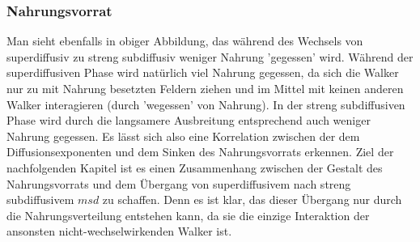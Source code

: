 \documentclass[a4paper, 12pt]{scrartcl}
\begin{document}
\newpage
\subsubsection{Nahrungsvorrat}
\noindent Man sieht ebenfalls in obiger Abbildung, das während des Wechsels von superdiffusiv zu streng subdiffusiv weniger Nahrung 'gegessen' wird. Während der superdiffusiven Phase wird natürlich viel Nahrung gegessen, da sich die Walker nur zu mit Nahrung besetzten Feldern ziehen und im Mittel mit keinen anderen Walker interagieren (durch 'wegessen' von Nahrung). In der streng subdiffusiven Phase wird durch die langsamere Ausbreitung entsprechend auch weniger Nahrung gegessen. Es lässt sich also eine Korrelation zwischen der dem Diffusionsexponenten und dem Sinken des Nahrungsvorrats erkennen.
\newpage
\noindent Ziel der nachfolgenden Kapitel ist es einen Zusammenhang zwischen der Gestalt des Nahrungsvorrats und dem Übergang von superdiffusivem nach streng subdiffusivem $msd$ zu schaffen. Denn es ist klar, das dieser Übergang nur durch die Nahrungsverteilung entstehen kann, da sie die einzige Interaktion der ansonsten nicht-wechselwirkenden Walker ist.
\end{document}
